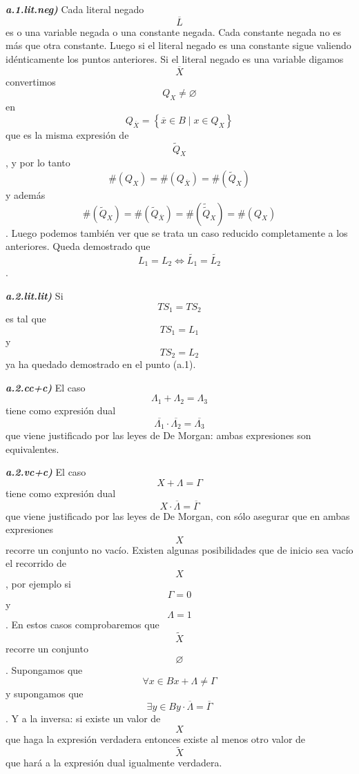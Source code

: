 \begin{enumerate}
\begin{enumerate}
\begin{enumerate}
\begin{enumerate}
\begin{enumerate}
          \emph{\textbf{a.1.lit.neg)}} Cada literal negado
          \[\overline{L}\] es o una variable negada o una cons\-tante
          negada. Cada constante negada no es más que otra constante.
          Luego si el literal negado es una constante sigue valiendo
          idénticamente los puntos anteriores. Si el literal negado es
          una variable digamos \[\overline{X}\] convertimos
          \[Q_{X} \neq \varnothing\] en
          \[Q_{\overline{X}} = \left\{ {{\overline{x} \in B} \mid {x \in Q_{X}}} \right\}\]
          que es la misma expresión de \[{\widetilde{Q}}_{X}\], y por lo
          tanto
          \[\#{{(Q_{X})} = \#}{{(Q_{\overline{X}})} = \#}{({\widetilde{Q}}_{X})}\]y
          además
          \[\#{{({\widetilde{Q}}_{X})} = \#}{{({\widetilde{Q}}_{\overline{X}})} = \#}{{({\widetilde{\widetilde{Q}}}_{X})} = \#}{(Q_{X})}\].
          Luego podemos también ver que se trata un caso reducido
          completamente a los anteriores. Queda demostrado que
          \[{L_{1} = L_{2}}\Leftrightarrow{\widetilde{L_{1}} = \widetilde{L_{2}}}\]
          .

          \emph{\textbf{a.2.lit.lit)}} Si
          \[\mathit{TS}_{1} = \mathit{TS}_{2}\] es tal que
          \[\mathit{TS}_{1} = L_{1}\] y \[\mathit{TS}_{2} = L_{2}\] ya
          ha queda\-do demostrado en el punto (a.1).

          \emph{\textbf{a.2.cc+c)}} El caso
          \[{\Lambda_{1} + \Lambda_{2}} = \Lambda_{3}\] tiene como
          expresión dual
          \[{\overline{\Lambda_{1}} \cdot \overline{\Lambda_{2}}} = \overline{\Lambda_{3}}\]que
          viene justificado por las leyes de De Morgan: ambas
          expresiones son equivalentes.

          \emph{\textbf{a.2.vc+c)}} El caso \[{X + \Lambda} = \Gamma\]
          tiene como expresión dual
          \[{X \cdot \overline{\Lambda}} = \overline{\Gamma}\] que viene
          justificado por las leyes de De Morgan, con sólo asegurar que
          en am\-bas expresiones \[X\]recorre un conjunto no vacío.
          Existen algunas posibili\-dades que de inicio sea vacío el
          recorrido de \[X\], por ejemplo si \[\Gamma = 0\] y
          \[\Lambda = 1\]. En estos casos comprobaremos que
          \[\widetilde{X}\] recorre un conjunto \[\varnothing\].
          Supongamos que
          \[\forall{x \in B}{{x + \Lambda} \neq \Gamma}\]y supongamos
          que
          \[\exists{y \in B}{{y \cdot \overline{\Lambda}} = \overline{\Gamma}}\].
          Y a la inversa: si existe un valor de \[X\] que haga la
          ex\-presión verdadera entonces existe al menos otro valor de
          \[\widetilde{X}\] que hará a la expresión dual igualmente
          verdadera.


\end{enumerate}
\end{enumerate}
\end{enumerate}
\end{enumerate}
\end{enumerate}

